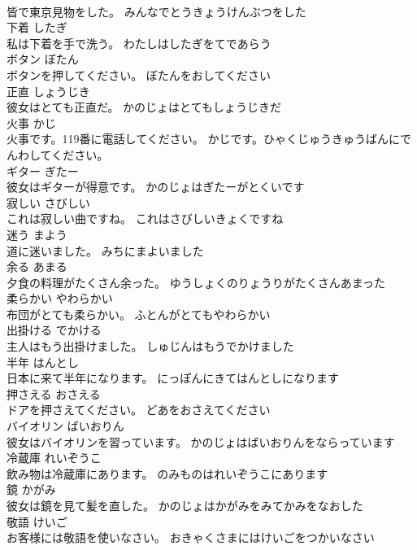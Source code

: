 \documentclass[8pt]{extreport}
\begin{document}
\begin{CJK}{UTF8}{min}
\\	皆で東京見物をした。	みんなでとうきょうけんぶつをした	
\\	下着	したぎ	
\\	私は下着を手で洗う。	わたしはしたぎをてであらう	
\\	ボタン	ぼたん	
\\	ボタンを押してください。	ぼたんをおしてください	
\\	正直	しょうじき	
\\	彼女はとても正直だ。	かのじょはとてもしょうじきだ	
\\	火事	かじ	
\\	火事です。119番に電話してください。	かじです。ひゃくじゅうきゅうばんにでんわしてください。	
\\	ギター	ぎたー	
\\	彼女はギターが得意です。	かのじょはぎたーがとくいです	
\\	寂しい	さびしい	
\\	これは寂しい曲ですね。	これはさびしいきょくですね	
\\	迷う	まよう	
\\	道に迷いました。	みちにまよいました	
\\	余る	あまる	
\\	夕食の料理がたくさん余った。	ゆうしょくのりょうりがたくさんあまった	
\\	柔らかい	やわらかい	
\\	布団がとても柔らかい。	ふとんがとてもやわらかい	
\\	出掛ける	でかける	
\\	主人はもう出掛けました。	しゅじんはもうでかけました	
\\	半年	はんとし	
\\	日本に来て半年になります。	にっぽんにきてはんとしになります	
\\	押さえる	おさえる	
\\	ドアを押さえてください。	どあをおさえてください	
\\	バイオリン	ばいおりん	
\\	彼女はバイオリンを習っています。	かのじょはばいおりんをならっています	
\\	冷蔵庫	れいぞうこ	
\\	飲み物は冷蔵庫にあります。	のみものはれいぞうこにあります	
\\	鏡	かがみ	
\\	彼女は鏡を見て髪を直した。	かのじょはかがみをみてかみをなおした	
\\	敬語	けいご	
\\	お客様には敬語を使いなさい。	おきゃくさまにはけいごをつかいなさい	

\end{CJK}
\end{document}
